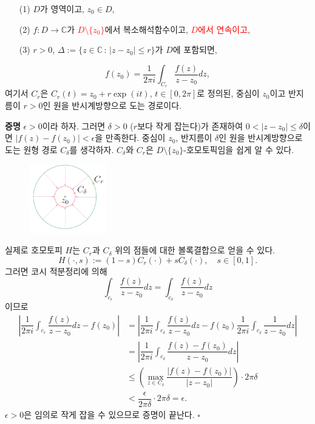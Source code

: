 \begin{saltprop}{}{} \label{prop-3-5}
\begin{itemize}
\item[(1)] $D$가 영역이고, $z_0\in D$,
\item[(2)] $f:D\to\mathbb C$가 \textcolor{red}{$D\setminus \{z_0\}$}에서 복소해석함수이고,
\textcolor{red}{$D$에서 연속이고},
\item[(3)] $r>0$, 
$\Delta := \{ z\in \mathbb C\,:\, |z-z_0| \le r\}$가 $D$에 포함되면,
\end{itemize}
\[
f(z_0) = \dfrac1{2\pi i} \int_{C_r} \dfrac{f(z)}{z-z_0} dz, 
\]
여기서 $C_r$은 $C_r(t) = z_0 + r\exp(it)$, $t\in [0,2\pi]$로 
정의된, 중심이 $z_0$이고 반지름이 $r>0$인 
원을 반시계방향으로 도는 경로이다.
\end{saltprop}

{\bf 증명}
$\epsilon>0$이라 하자.
그러면 $\delta>0$ ($r$보다 작게 잡는다)가 존재하여
$0<|z-z_0|\le \delta$이면 $|f(z) - f(z_0)|<\epsilon$을 만족한다.
중심이 $z_0$, 반지름이 $\delta$인 원을 반시계방향으로 도는 원형 경로 $C_\delta$를 생각하자.
$C_\delta$와 $C_r$은 $D\setminus\{z_0\}$-호모토픽임을 쉽게 알 수 있다.

\begin{figure}[h!]
\begin{center}
\includegraphics[width=0.3\textwidth]{./SaltChapter/fig-3-0-8}
\end{center}
\end{figure}

실제로 호모토피 $H$는 $C_r$과  $C_\delta$ 위의 점들에 대한 볼록결합으로 얻을 수 있다.
\[
H(\cdot, s) := (1-s)C_r(\cdot) + sC_\delta(\cdot), 
\quad s\in [0,1].
\]
그러면 코시 적분정리에 의해 
\[
\int_{c_r} \dfrac{f(z)}{z-z_0}dz = \int_{c_\delta} \dfrac{f(z)}{z-z_0}dz
\]
이므로
\begin{align*}
\left| \dfrac1{2\pi i} \int_{c_r} \dfrac{f(z)}{z-z_0}dz - f(z_0) \right|
&= \left|  \dfrac1{2\pi i}\int_{c_\delta} \dfrac{f(z)}{z-z_0}dz - 
f(z_0)  \dfrac1{2\pi i} \int_{c_\delta} \dfrac{1}{z-z_0}dz \right| \\
&= \left|  \dfrac1{2\pi i}\int_{c_\delta} \dfrac{f(z)-f(z_0)}{z-z_0}dz \right| \\
&\le \left( \max_{z\in C_\delta} \dfrac{|f(z)-f(z_0)|}{|z-z_0|}  \right) \cdot 2\pi\delta \\
&< \dfrac \epsilon{2\pi \delta} \cdot 2\pi \delta = \epsilon.
\end{align*}
$\epsilon>0$은 임의로 작게 잡을 수 있으므로 증명이 끝난다.
\hfill $\square$

